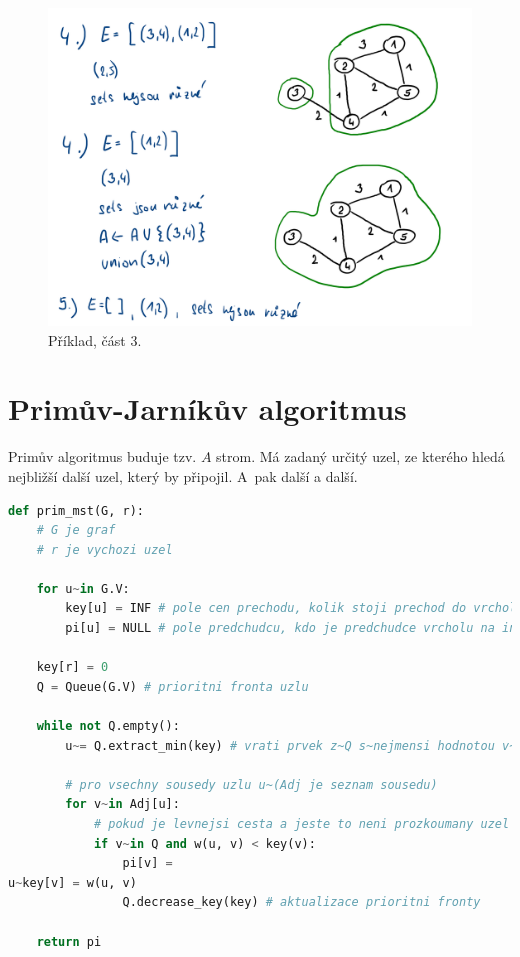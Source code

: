 \begin{figure}[H]
    \centering
    \includegraphics[width=0.9\linewidth]{03-minimalni-kostry-13.pdf}
    \caption{Příklad, část 3.}
\end{figure}


\section{Primův-Jarníkův algoritmus}

Primův algoritmus buduje tzv. $A$ strom. Má zadaný určitý uzel, ze kterého hledá nejbližší další uzel, který by připojil. A~pak další a další.

\bigskip\noindent\begin{minipage}{\linewidth}
\begin{lstlisting}[language=Python, caption={Primův algoritmus.}]
def prim_mst(G, r):
    # G je graf
    # r je vychozi uzel

    for u~in G.V:
        key[u] = INF # pole cen prechodu, kolik stoji prechod do vrcholu na indexu
        pi[u] = NULL # pole predchudcu, kdo je predchudce vrcholu na indexu

    key[r] = 0
    Q = Queue(G.V) # prioritni fronta uzlu

    while not Q.empty():
        u~= Q.extract_min(key) # vrati prvek z~Q s~nejmensi hodnotou v~key

        # pro vsechny sousedy uzlu u~(Adj je seznam sousedu)
        for v~in Adj[u]:
            # pokud je levnejsi cesta a jeste to neni prozkoumany uzel
            if v~in Q and w(u, v) < key(v):
                pi[v] =
u~key[v] = w(u, v)
                Q.decrease_key(key) # aktualizace prioritni fronty

    return pi
\end{lstlisting}
\end{minipage}

